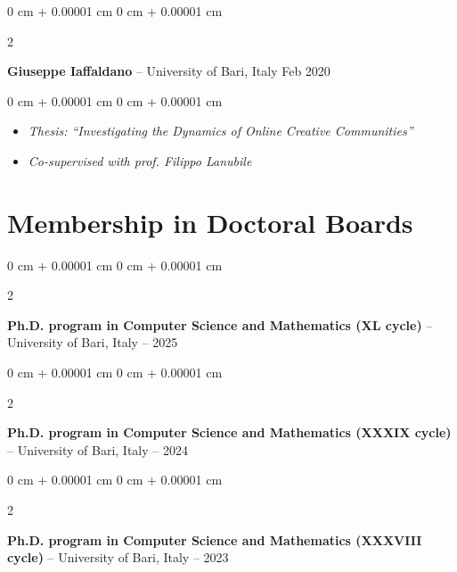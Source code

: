 \documentclass[10pt, a4paper]{article}
\newenvironment{highlights}{
    \begin{itemize}[
        topsep=0.10 cm,
        parsep=0.10 cm,
        partopsep=0pt,
        itemsep=0pt,
        leftmargin=0 cm + 10pt
    ]
}{
    \end{itemize}
} %
\newenvironment{onecolentry}{
    \begin{adjustwidth}{
        0 cm + 0.00001 cm
    }{
        0 cm + 0.00001 cm
    }
}{
    \end{adjustwidth}
} %
\newenvironment{twocolentry}[2][]{
    \onecolentry
    \def\secondColumn{#2}
    \setcolumnwidth{\fill, 4.5 cm}
    \begin{paracol}{2}
}{
    \switchcolumn \raggedleft \secondColumn
    \end{paracol}
    \endonecolentry
} %
\begin{document}
        \vspace{0.2 cm}

        \begin{twocolentry}{
            Feb 2020
        }
            \textbf{Giuseppe Iaffaldano} -- University of Bari, Italy\end{twocolentry}

        \vspace{0.10 cm}
        \begin{onecolentry}
            \begin{highlights}
                \item \textit{Thesis: ``Investigating the Dynamics of Online Creative Communities''}
                \item \textit{Co-supervised with prof. Filippo Lanubile}
            \end{highlights}
        \end{onecolentry}



    
    \section{Membership in Doctoral Boards}



        
        \begin{twocolentry}{
            2024 – 2025
        }
            \textbf{Ph.D. program in Computer Science and Mathematics (XL cycle)} -- University of Bari, Italy\end{twocolentry}



        \vspace{0.2 cm}

        \begin{twocolentry}{
            2023 – 2024
        }
            \textbf{Ph.D. program in Computer Science and Mathematics (XXXIX cycle)} -- University of Bari, Italy\end{twocolentry}



        \vspace{0.2 cm}

        \begin{twocolentry}{
            2022 – 2023
        }
            \textbf{Ph.D. program in Computer Science and Mathematics (XXXVIII cycle)} -- University of Bari, Italy\end{twocolentry}
\end{document}
